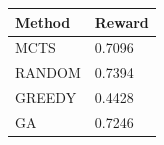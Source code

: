 \begin{tabular}{ll}
\hline
Method & Reward \\
\hline
  MCTS & 0.7096 \\
  RANDOM & 0.7394 \\
  GREEDY & 0.4428 \\
  GA & 0.7246 \\
\hline
\end{tabular}
